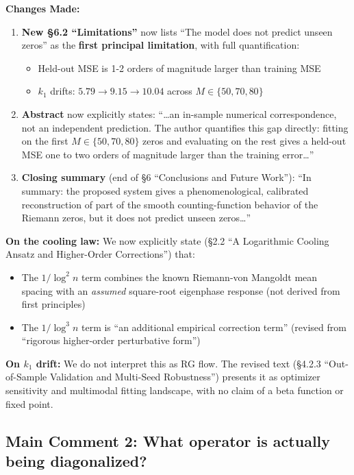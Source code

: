 \documentclass[11pt]{article}
\begin{document}
\noindent\textbf{Changes Made:}
\begin{enumerate}
\item \textbf{New \S6.2 ``Limitations''} now lists ``The model does not predict unseen zeros'' as the \textbf{first principal limitation}, with full quantification:
\begin{itemize}
\item Held-out MSE is 1-2 orders of magnitude larger than training MSE
\item $k_1$ drifts: $5.79 \to 9.15 \to 10.04$ across $M \in \{50,70,80\}$
\end{itemize}
\item \textbf{Abstract} now explicitly states: ``\ldots an in-sample numerical correspondence, not an independent prediction. The author quantifies this gap directly: fitting on the first $M\in\{50,70,80\}$ zeros and evaluating on the rest gives a held-out MSE one to two orders of magnitude larger than the training error\ldots''
\item \textbf{Closing summary} (end of \S6 ``Conclusions and Future Work''): ``In summary: the proposed system gives a phenomenological, calibrated reconstruction of part of the smooth counting-function behavior of the Riemann zeros, but it does not predict unseen zeros\ldots''
\end{enumerate}

\noindent\textbf{On the cooling law:} We now explicitly state (\S2.2 ``A Logarithmic Cooling Ansatz and Higher-Order Corrections'') that:
\begin{itemize}
\item The $1/\log^2 n$ term combines the known Riemann-von Mangoldt mean spacing with an \emph{assumed} square-root eigenphase response (not derived from first principles)
\item The $1/\log^3 n$ term is ``an additional empirical correction term'' (revised from ``rigorous higher-order perturbative form'')
\end{itemize}

\noindent\textbf{On $k_1$ drift:} We do not interpret this as RG flow. The revised text (\S4.2.3 ``Out-of-Sample Validation and Multi-Seed Robustness'') presents it as optimizer sensitivity and multimodal fitting landscape, with no claim of a beta function or fixed point.

\subsection*{Main Comment 2: What operator is actually being diagonalized?}
\end{document}

